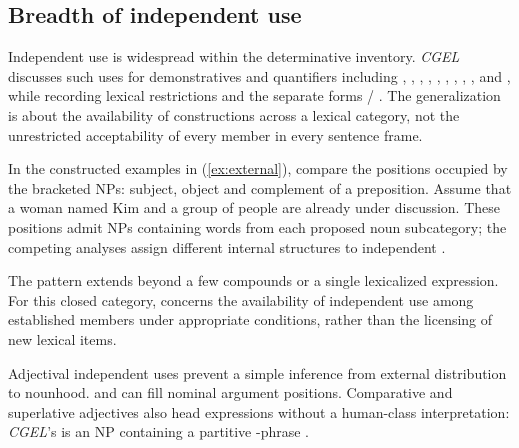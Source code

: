 \documentclass[12pt]{article}
\begin{document}
\subsection{Breadth of independent use}

Independent use is widespread within the determinative inventory. \textit{CGEL} discusses such uses for demonstratives and quantifiers including , , , , , , , , ,  and , while recording lexical restrictions and the separate forms / \citep[371--372, 410--424]{huddleston2002}. The generalization is about the availability of constructions across a lexical category, not the unrestricted acceptability of every member in every sentence frame.

In the constructed examples in (\ref{ex:external}), compare the positions occupied by the bracketed NPs: subject, object and complement of a preposition. Assume that a woman named Kim and a group of people are already under discussion. These positions admit NPs containing words from each proposed noun subcategory; the competing analyses assign different internal structures to independent .

\begin{samepage}
\ea\label{ex:external}
\ea {}\qquad {}\qquad {}
\ex {}\qquad {}\qquad {}
\ex {}\qquad {}\qquad {}
\ex {}\qquad {}\qquad {}
\z\z
\end{samepage}

The pattern extends beyond a few compounds or a single lexicalized expression. For this closed category,  concerns the availability of independent use among established members under appropriate conditions, rather than the licensing of new lexical items.

Adjectival independent uses prevent a simple inference from external distribution to nounhood.  and  can fill nominal argument positions. Comparative and superlative adjectives also head expressions without a human-class interpretation: \textit{CGEL}'s  is an NP containing a partitive -phrase \citep[332--333, 416--423]{huddleston2002}.
\end{document}
